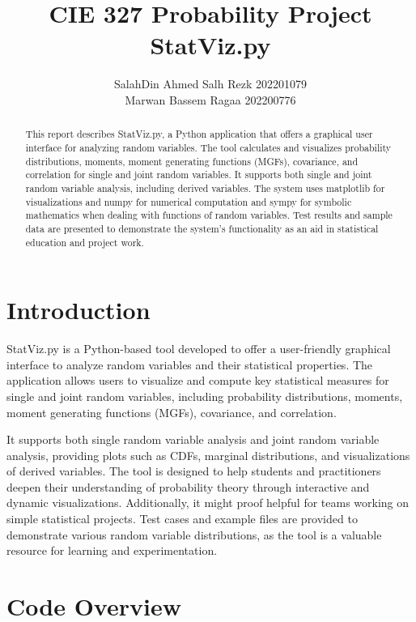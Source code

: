 \documentclass{article}
\title{CIE 327 Probability Project\\\large StatViz.py}
\author{SalahDin Ahmed Salh Rezk 202201079\\Marwan Bassem Ragaa 202200776}
\begin{document}
\maketitle

\begin{abstract}
This report describes StatViz.py, a Python application that offers a graphical user interface for analyzing random variables. The tool calculates and visualizes probability distributions, moments, moment generating functions (MGFs), covariance, and correlation for single and joint random variables. It supports both single and joint random variable analysis, including derived variables. The system uses matplotlib for visualizations and numpy for numerical computation and sympy for symbolic mathematics when dealing with functions of random variables. Test results and sample data are presented to demonstrate the system's functionality as an aid in statistical education and project work.
\end{abstract}

\tableofcontents
\newpage
\listoffigures

\newpage

\section{Introduction}

StatViz.py is a Python-based tool developed to offer a user-friendly graphical interface to analyze random variables and their statistical properties. The application allows users to visualize and compute key statistical measures for single and joint random variables, including probability distributions, moments, moment generating functions (MGFs), covariance, and correlation.

It supports both single random variable analysis and joint random variable analysis, providing plots such as CDFs, marginal distributions, and visualizations of derived variables. The tool is designed to help students and practitioners deepen their understanding of probability theory through interactive and dynamic visualizations. Additionally, it might proof helpful for teams working on simple statistical projects. Test cases and example files are provided to demonstrate various random variable distributions, as the tool is a valuable resource for learning and experimentation.

\section{Code Overview}
\end{document}
